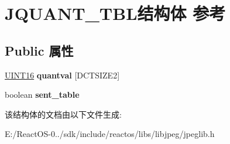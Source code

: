 \hypertarget{struct_j_q_u_a_n_t___t_b_l}{}\section{J\+Q\+U\+A\+N\+T\+\_\+\+T\+B\+L结构体 参考}
\label{struct_j_q_u_a_n_t___t_b_l}
\subsection*{Public 属性}
\begin{DoxyCompactItemize}
\item 
\mbox{\label{struct_j_q_u_a_n_t___t_b_l_ab5b5150e73282a62ca7dc0f7e2fac944}} 
\hyperlink{_processor_bind_8h_a09f1a1fb2293e33483cc8d44aefb1eb1}{U\+I\+N\+T16} {\bfseries quantval} \mbox{[}D\+C\+T\+S\+I\+Z\+E2\mbox{]}
\item 
\mbox{\label{struct_j_q_u_a_n_t___t_b_l_a218b782157eccfbd22023ae6bb4cc7fa}} 
boolean {\bfseries sent\+\_\+table}
\end{DoxyCompactItemize}


该结构体的文档由以下文件生成\+:\begin{DoxyCompactItemize}
\item 
E\+:/\+React\+O\+S-\/0../sdk/include/reactos/libs/libjpeg/jpeglib.\+h\end{DoxyCompactItemize}
